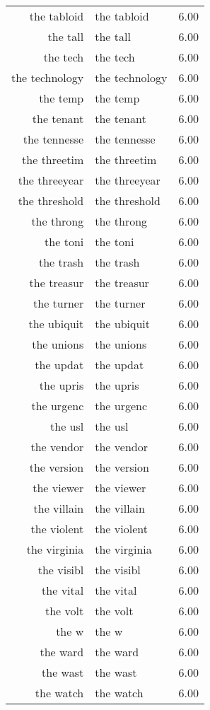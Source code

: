 \begin{table}[ht]
\begin{tabular}{rlr}
  the tabloid & the tabloid & 6.00 \\ 
  the tall & the tall & 6.00 \\ 
  the tech & the tech & 6.00 \\ 
  the technology & the technology & 6.00 \\ 
  the temp & the temp & 6.00 \\ 
  the tenant & the tenant & 6.00 \\ 
  the tennesse & the tennesse & 6.00 \\ 
  the threetim & the threetim & 6.00 \\ 
  the threeyear & the threeyear & 6.00 \\ 
  the threshold & the threshold & 6.00 \\ 
  the throng & the throng & 6.00 \\ 
  the toni & the toni & 6.00 \\ 
  the trash & the trash & 6.00 \\ 
  the treasur & the treasur & 6.00 \\ 
  the turner & the turner & 6.00 \\ 
  the ubiquit & the ubiquit & 6.00 \\ 
  the unions & the unions & 6.00 \\ 
  the updat & the updat & 6.00 \\ 
  the upris & the upris & 6.00 \\ 
  the urgenc & the urgenc & 6.00 \\ 
  the usl & the usl & 6.00 \\ 
  the vendor & the vendor & 6.00 \\ 
  the version & the version & 6.00 \\ 
  the viewer & the viewer & 6.00 \\ 
  the villain & the villain & 6.00 \\ 
  the violent & the violent & 6.00 \\ 
  the virginia & the virginia & 6.00 \\ 
  the visibl & the visibl & 6.00 \\ 
  the vital & the vital & 6.00 \\ 
  the volt & the volt & 6.00 \\ 
  the w & the w & 6.00 \\ 
  the ward & the ward & 6.00 \\ 
  the wast & the wast & 6.00 \\ 
  the watch & the watch & 6.00 \\ 

\end{tabular}
\end{table}
